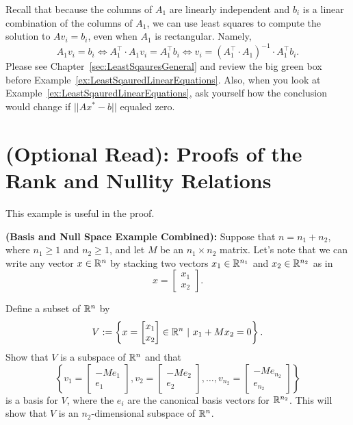 \begin{remark} Recall that because the columns of $A_1$ are linearly independent and $b_i$ is a linear combination of the columns of $A_1$, we can use least squares to compute the solution to $Av_i = b_i$, even when $A_1$ is rectangular. Namely, 
$$ A_1 v_i = b_i  \iff A_1^\top \cdot A_1 v_i = A_1^\top b_i \iff v_i = (A_1^\top \cdot A_1)^{-1} \cdot A_1^\top b_i. $$
Please see Chapter~\ref{sec:LeastSqauresGeneral} and review the big green box before Example~\ref{ex:LeastSqauredLinearEquations}. Also, when you look at Example~\ref{ex:LeastSqauredLinearEquations}, ask yourself how the conclusion would change if $||Ax^\ast -b||$ equaled zero. 
\end{remark}



\section{(Optional Read): Proofs of the Rank and Nullity Relations}
This example is useful in the proof.

\begin{example}
\label{ex:MoreGeneralSubsapce} \textbf{(Basis and Null Space Example Combined):} Suppose that $n=n_1+n_2$, where $n_1\ge 1$ and $n_2 \ge 1$, and let $M$ be an $n_1 \times n_2$ matrix. Let's note that we can write any vector $x\in \mathbb R^n$ by stacking two vectors $x_1 \in \mathbb R^{n_1}$ and $x_2 \in \mathbb R^{n_2}$ as in 
$$ x=\begin{bmatrix} x_1 \\x_2  \end{bmatrix}. $$

Define a subset of $\mathbb R^n$ by
$$V:=\left\{ x=\begin{bmatrix} x_1 \\x_2 \end{bmatrix} \in \mathbb R^n ~|~ x_1 + M x_2=0 \right\}. $$
Show that $V$ is a subspace of $\mathbb R^n$ and that 
\begin{equation}
    \label{eq:BasisLeadingToNullspace}
    \left\{ v_1= \left[\begin{array}{c}
    -M e_1 \\ e_1
\end{array}\right] , 
v_2= \left[\begin{array}{c}
    -Me_2 \\ e_2
\end{array}\right], \ldots, v_{n_2}= \left[\begin{array}{c}
    -Me_{n_2} \\ e_{n_2}
\end{array}\right]
\right\}
\end{equation} 
is a basis for $V$, where the $e_i$ are the canonical basis vectors for $\mathbb R^{n_2}$. This will show that $V$ is an $n_2$-dimensional subspace of $\mathbb R^n$.
\end{example}

